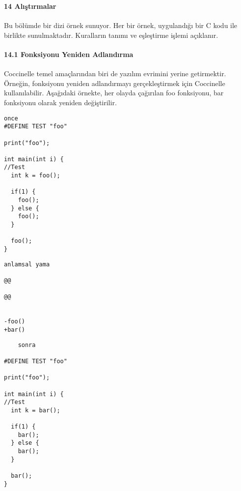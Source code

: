 \documentclass[22pt]{article}
\begin{document}
\textbf{14 Alıştırmalar}\\
\\
Bu bölümde bir dizi örnek sunuyor. Her bir örnek, uygulandığı bir C kodu ile birlikte sunulmaktadır. Kuralların tanımı ve eşleştirme işlemi açıklanır.\\
\\
\textbf{14.1 Fonksiyonu Yeniden Adlandırma}\\
\\
Coccinelle temel amaçlarından biri de yazılım evrimini yerine getirmektir. Örneğin, fonksiyonu yeniden adlandırmayı gerçekleştirmek için Coccinelle kullanılabilir. Aşağıdaki örnekte, her olayda çağırılan foo fonksiyonu, bar fonksiyonu olarak yeniden değiştirilir.\\

\begin{multicols*}{3}
				
\begin{lstlisting}
once
#DEFINE TEST "foo"		

print("foo");			

int main(int i) {		
//Test				
  int k = foo();		

  if(1) {			
    foo();  			
  } else {			
    foo();			
  }				

  foo();			
}
\end{lstlisting}

\columnbreak

\begin{lstlisting}
anlamsal yama		

@@			

@@			

			
-foo()			
+bar()
\end{lstlisting}
\columnbreak
\begin{lstlisting}
	sonra

#DEFINE TEST "foo"

print("foo");

int main(int i) {
//Test
  int k = bar();

  if(1) {
    bar();
  } else {
    bar();	
  }

  bar();
}
\end{lstlisting}
\end{multicols*}
\end{document}
